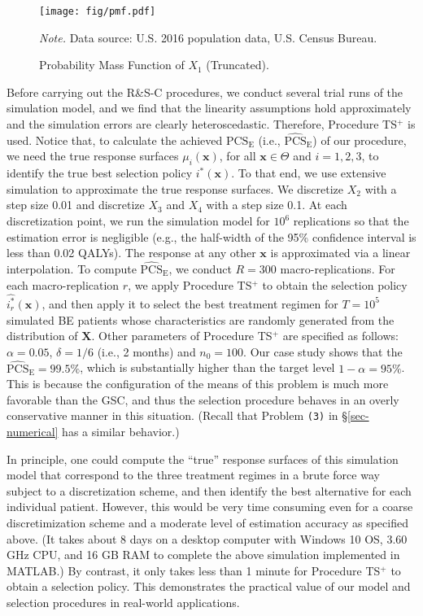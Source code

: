 \documentclass[ijoc,nonblindrev]{informs3}
\def\bx{{\bm x}}
\def\bX{{\bm X}}
\def\PCSE{\mathrm{PCS}_{\mathrm{E}}}
\def\APCSE{\widehat{\mathrm{PCS}}_{\mathrm{E}}}
\begin{document}
\begin{figure}%
\centering
\texttt{[image: fig/pmf.pdf]}
\caption{Probability Mass Function of $X_1$ (Truncated).} \label{fig-pmf}
\begin{minipage}[t]{1\linewidth}
\SingleSpacedXI
\vspace{-1.2em}
\footnotesize{
\emph{Note.} \textsf{
Data source: U.S. 2016 population data, U.S. Census Bureau.
}
}
\end{minipage}
\end{figure}



Before carrying out the R\&S-C procedures, we conduct several trial runs of the simulation model, and we find that the linearity assumptions hold approximately and the simulation errors are clearly heteroscedastic. Therefore, Procedure TS$^+$ is used.
Notice that, to calculate the achieved $\PCSE$ (i.e., $\APCSE$) of our procedure, we need the true response surfaces $\mu_i(\bx)$, for all $\bx \in \Theta$ and $i=1,2,3$, to identify the true best selection policy $i^*(\bx)$.
To that end, we use extensive simulation to approximate the true response surfaces.
We discretize $X_2$ with a step size 0.01 and discretize $X_3$ and $X_4$ with a step size 0.1.
At each discretization point, we run the simulation model for $10^6$ replications so that the estimation error is negligible (e.g., the half-width of the 95\% confidence interval is less than 0.02 QALYs).
The response at any other $\bx$ is approximated via a linear interpolation.
To compute $\APCSE$, we conduct $R = 300$ macro-replications.
For each macro-replication $r$, we apply Procedure TS$^+$ to obtain the selection policy $\widehat{i^*_r}(\bx)$,
and then apply it to select the best treatment regimen for $T = 10^5$ simulated BE patients whose characteristics are randomly generated from the distribution of $\bX$.
Other parameters of Procedure TS$^+$ are specified as follows:
$\alpha = 0.05$, $\delta = 1/6$ (i.e., 2 months) and $n_0 = 100$.
Our case study shows that the $\APCSE = 99.5\%$, which is substantially higher than the target level $1-\alpha=95\%$.
This is because the configuration of the means of this problem is much more favorable than the GSC, and thus the selection procedure behaves in an overly conservative manner in this situation.
(Recall that Problem \texttt{(3)} in \S \ref{sec-numerical} has a similar behavior.)

\begin{remark}
In principle, one could compute the ``true'' response surfaces of this simulation model that correspond to the three treatment regimes in a brute force way subject to a discretization scheme, and then identify the best alternative for each individual patient. However, this would be very time consuming even for a coarse discretimization scheme and a moderate level of estimation accuracy as specified above. (It takes about 8 days on a desktop computer with Windows 10 OS, 3.60 GHz CPU, and 16 GB RAM to complete the above simulation implemented in MATLAB.)
By contrast, it only takes less than 1 minute for Procedure TS$^+$ to obtain a selection policy.
This demonstrates the practical value of our model and selection procedures in real-world applications.
\end{remark}
\end{document}

